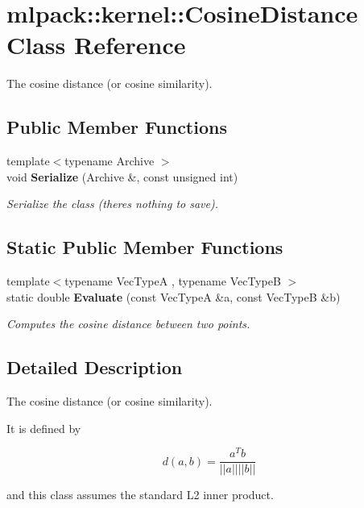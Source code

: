 \section{mlpack\+:\+:kernel\+:\+:Cosine\+Distance Class Reference}
\label{classmlpack_1_1kernel_1_1CosineDistance}


The cosine distance (or cosine similarity).  


\subsection*{Public Member Functions}
\begin{DoxyCompactItemize}
\item 
{\footnotesize template$<$typename Archive $>$ }\\void {\bf Serialize} (Archive \&, const unsigned int)
\begin{DoxyCompactList}\small\item\em Serialize the class (there\textquotesingle{}s nothing to save). \end{DoxyCompactList}\end{DoxyCompactItemize}
\subsection*{Static Public Member Functions}
\begin{DoxyCompactItemize}
\item 
{\footnotesize template$<$typename Vec\+TypeA , typename Vec\+TypeB $>$ }\\static double {\bf Evaluate} (const Vec\+TypeA \&a, const Vec\+TypeB \&b)
\begin{DoxyCompactList}\small\item\em Computes the cosine distance between two points. \end{DoxyCompactList}\end{DoxyCompactItemize}


\subsection{Detailed Description}
The cosine distance (or cosine similarity). 

It is defined by

\[ d(a, b) = \frac{a^T b}{|| a || || b ||} \]

and this class assumes the standard L2 inner product. 

